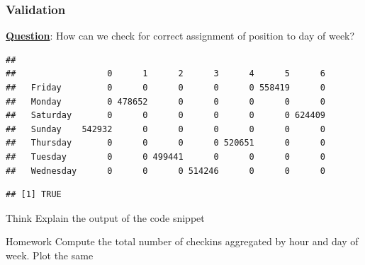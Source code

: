 \documentclass[12pt]{book}\usepackage{knitr}
\begin{document}
\subsubsection{Validation}
\noindent \textbf{\underline{Question}}: How can we check for correct assignment of position to day of week?
\begin{knitrout}
\color{fgcolor}\begin{kframe}
\begin{alltt}
\hlopt{$}\hlopt{$}
\end{alltt}
\begin{verbatim}
##            
##                  0      1      2      3      4      5      6
##   Friday         0      0      0      0      0 558419      0
##   Monday         0 478652      0      0      0      0      0
##   Saturday       0      0      0      0      0      0 624409
##   Sunday    542932      0      0      0      0      0      0
##   Thursday       0      0      0      0 520651      0      0
##   Tuesday        0      0 499441      0      0      0      0
##   Wednesday      0      0      0 514246      0      0      0
\end{verbatim}
\begin{alltt}
\hlstd{(}\hlopt{$}\hlopt{$} \hlopt{==}
  \hlstd{(checkins)[}\hlstd{]}
\end{alltt}
\begin{verbatim}
## [1] TRUE
\end{verbatim}
\begin{alltt}
\end{alltt}
\end{kframe}
\end{knitrout}

\begin{DIY}{Think}
\noindent Explain the output of the code snippet 
\end{DIY}

\begin{DIY}{Homework}
\noindent Compute the total number of checkins aggregated by hour and day of week. Plot the same 
\end{DIY}

\newpage
\end{document}
